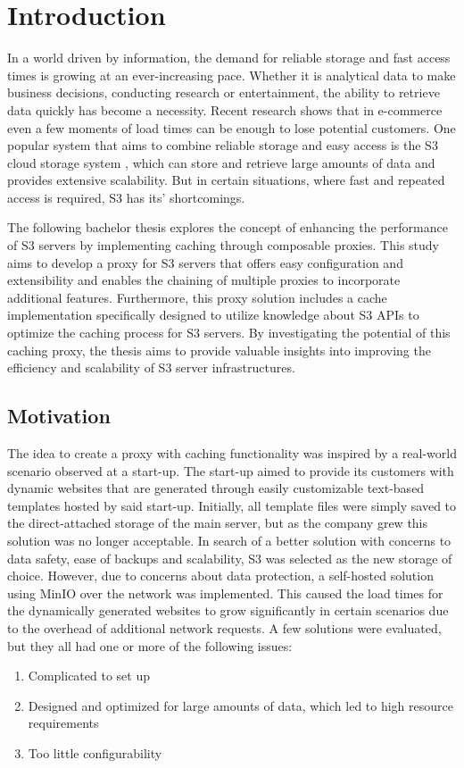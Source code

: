 \chapter{Introduction}

In a world driven by information, the demand for reliable storage and fast access times is growing at an ever-increasing pace. Whether it is analytical data to make business decisions, conducting research or entertainment, the ability to retrieve data quickly has become a necessity. Recent research \cite{locattimes_ecom} shows that in e-commerce even a few moments of load times can be enough to lose potential customers.
One popular system that aims to combine reliable storage and easy access is the S3 cloud storage system \cite{AWS_S3_Release}, which can store and retrieve large amounts of data and provides extensive scalability. But in certain situations, where fast and repeated access is required, S3 has its' shortcomings.

The following bachelor thesis explores the concept of enhancing the performance of S3 servers by implementing caching through composable proxies. This study aims to develop a proxy for S3 servers that offers easy configuration and extensibility and enables the chaining of multiple proxies to incorporate additional features. Furthermore, this proxy solution includes a cache implementation specifically designed to utilize knowledge about S3 APIs to optimize the caching process for S3 servers. By investigating the potential of this caching proxy, the thesis aims to provide valuable insights into improving the efficiency and scalability of S3 server infrastructures.

\section{Motivation}

The idea to create a proxy with caching functionality was inspired by a real-world scenario observed at a start-up. The start-up aimed to provide its customers with dynamic websites that are generated through easily customizable text-based templates hosted by said start-up. Initially, all template files were simply saved to the direct-attached storage of the main server, but as the company grew this solution was no longer acceptable. In search of a better solution with concerns to data safety, ease of backups and scalability, S3 was selected as the new storage of choice. However, due to concerns about data protection, a self-hosted solution using MinIO \cite{MINIO_GITHUB} over the network was implemented.
This caused the load times for the dynamically generated websites to grow significantly in certain scenarios due to the overhead of additional network requests.
A few solutions were evaluated, but they all had one or more of the following issues:
\begin{enumerate}
	\item Complicated to set up
	\item Designed and optimized for large amounts of data, which led to high resource requirements
	\item Too little configurability
\end{enumerate}


